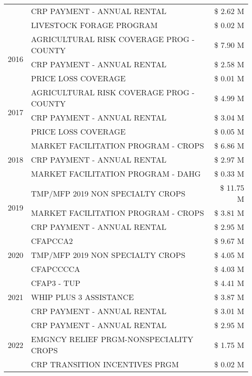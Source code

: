 \begin{tabular}{llr}
 & CRP PAYMENT - ANNUAL RENTAL & \$ 2.62 M \\
 & LIVESTOCK FORAGE PROGRAM & \$ 0.02 M \\
\cline{1-3}
\multirow[t]{3}{*}{2016} & AGRICULTURAL RISK COVERAGE PROG - COUNTY & \$ 7.90 M \\
 & CRP PAYMENT - ANNUAL RENTAL & \$ 2.58 M \\
 & PRICE LOSS COVERAGE & \$ 0.01 M \\
\cline{1-3}
\multirow[t]{3}{*}{2017} & AGRICULTURAL RISK COVERAGE PROG - COUNTY & \$ 4.99 M \\
 & CRP PAYMENT - ANNUAL RENTAL & \$ 3.04 M \\
 & PRICE LOSS COVERAGE & \$ 0.05 M \\
\cline{1-3}
\multirow[t]{3}{*}{2018} & MARKET FACILITATION PROGRAM - CROPS & \$ 6.86 M \\
 & CRP PAYMENT - ANNUAL RENTAL & \$ 2.97 M \\
 & MARKET FACILITATION PROGRAM - DAHG & \$ 0.33 M \\
\cline{1-3}
\multirow[t]{3}{*}{2019} & TMP/MFP 2019 NON SPECIALTY CROPS & \$ 11.75 M \\
 & MARKET FACILITATION PROGRAM - CROPS & \$ 3.81 M \\
 & CRP PAYMENT - ANNUAL RENTAL & \$ 2.95 M \\
\cline{1-3}
\multirow[t]{3}{*}{2020} & CFAPCCA2 & \$ 9.67 M \\
 & TMP/MFP 2019 NON SPECIALTY CROPS & \$ 4.05 M \\
 & CFAPCCCCA & \$ 4.03 M \\
\cline{1-3}
\multirow[t]{3}{*}{2021} & CFAP3 - TUP & \$ 4.41 M \\
 & WHIP PLUS 3 ASSISTANCE & \$ 3.87 M \\
 & CRP PAYMENT - ANNUAL RENTAL & \$ 3.01 M \\
\cline{1-3}
\multirow[t]{3}{*}{2022} & CRP PAYMENT - ANNUAL RENTAL & \$ 2.95 M \\
 & EMGNCY RELIEF PRGM-NONSPECIALITY CROPS & \$ 1.75 M \\
 & CRP TRANSITION INCENTIVES PRGM & \$ 0.02 M \\
\cline{1-3}
\bottomrule
\end{tabular}

